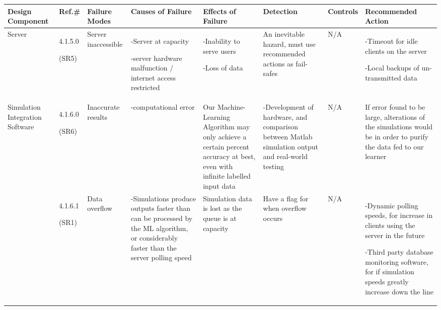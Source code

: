 \documentclass[12pt, titlepage]{article}
\begin{document}
\begin{center}
\begin{adjustwidth}{-3.5cm}{}
\begin{tabular}{|p{1.6cm}|p{1cm}|p{1.8cm}|p{2.4cm}|p{3cm}|p{1.7cm}|p{1.5cm}|p{4.5cm}|}
\hline
Design Component & Ref.\# & Failure Modes & Causes of Failure & Effects of Failure & Detection & Controls & Recommended Action\\
\hline
Server & 4.1.5.0 \par (SR5)& Server inaccessible & -Server at capacity \par -server hardware malfunction / internet access restricted & -Inability to serve users \par -Loss of data & An inevitable hazard, must use recommended actions as fail-safes & N/A &-Timeout for idle clients on the server \par -Local backups of un-transmitted data\\
\hline 
Simulation Integration Software & 4.1.6.0 \par (SR6)& Inaccurate results & -computational error & Our Machine-Learning Algorithm may only achieve a certain percent accuracy at best, even with infinite labelled input data & -Development of hardware, and comparison between Matlab simulation output and real-world testing & N/A & If error found to be large, alterations of the simulations would be in order to purify the data fed to our learner\\
&4.1.6.1 \par(SR1)& Data overflow & -Simulations produce outputs faster than can be processed by the ML algorithm, or considerably faster than the server polling speed & Simulation data is lost as the queue is at capacity & Have a flag for when overflow occurs & N/A & -Dynamic polling speeds, for increase in clients using the server in the future \par -Third party database monitoring software, for if simulation speeds greatly increase down the line\\
\hline
\end{tabular}
\end{adjustwidth}
\end{center}
\end{document}
